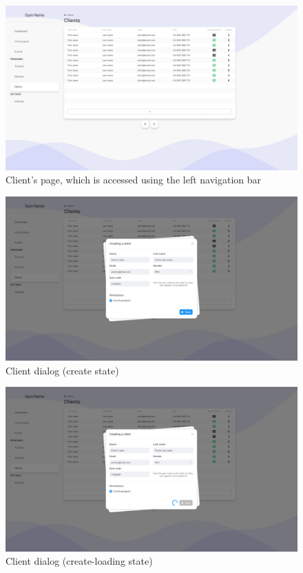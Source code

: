 \documentclass[a4paper, 12pt, oneside]{book}
\begin{document}
\begin{figure}[h!]
	\centering
	\includegraphics[width=\textwidth]{assets/ui/Clients.png}
	\caption{Client's page, which is accessed using the left navigation bar}
\end{figure}
\begin{figure}[h!]
	\centering
	\includegraphics[width=\textwidth]{assets/ui/ClientsCreate.png}
	\caption{Client dialog (create state)}
\end{figure}
\begin{figure}[h!]
	\centering
	\includegraphics[width=\textwidth]{assets/ui/ClientsCreateLoading.png}
	\caption{Client dialog (create-loading state)}
\end{figure}
\end{document}
